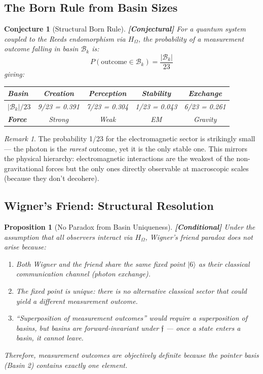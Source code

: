 \documentclass[12pt,a4paper]{article}
\newcommand{\conditional}[1]{\textcolor{conditional}{\textbf{[Conditional]}} #1}
\newcommand{\conjectural}[1]{\textcolor{conjectural}{\textbf{[Conjectural]}} #1}
\newtheorem{proposition}[theorem]{Proposition}
\newtheorem{conjecture}[theorem]{Conjecture}
\theoremstyle{definition}
\theoremstyle{remark}
\newtheorem{remark}[theorem]{Remark}
\newcommand{\Reeds}{\mathfrak{f}}
\newcommand{\Basin}{\mathcal{B}}
\newcommand{\HOmega}{H_\Omega}
\begin{document}
\subsection{The Born Rule from Basin Sizes}

\begin{conjecture}[Structural Born Rule]
\label{conj:born}
\conjectural{For a quantum system coupled to the Reeds endomorphism via $\HOmega$,
the probability of a measurement outcome falling in basin $\Basin_k$ is:}
\begin{equation}
  P(\text{outcome} \in \Basin_k) = \frac{|\Basin_k|}{23}
\end{equation}
giving:
\begin{center}
\begin{tabular}{lcccc}
\toprule
\textbf{Basin} & Creation & Perception & Stability & Exchange \\
\midrule
$|\Basin_k|/23$ & 9/23 = 0.391 & 7/23 = 0.304 & 1/23 = 0.043 & 6/23 = 0.261 \\
\textbf{Force} & Strong & Weak & EM & Gravity \\
\bottomrule
\end{tabular}
\end{center}
\end{conjecture}

\begin{remark}
The probability 1/23 for the electromagnetic sector is strikingly small --- the
photon is the \emph{rarest} outcome, yet it is the only stable one. This mirrors
the physical hierarchy: electromagnetic interactions are the weakest of the
non-gravitational forces but the only ones directly observable at macroscopic
scales (because they don't decohere).
\end{remark}

\subsection{Wigner's Friend: Structural Resolution}

\begin{proposition}[No Paradox from Basin Uniqueness]
\label{prop:wigner}
\conditional{Under the assumption that all observers interact via $\HOmega$,
Wigner's friend paradox does not arise because:}
\begin{enumerate}
  \item Both Wigner and the friend share the same fixed point $|6\rangle$ as
  their classical communication channel (photon exchange).
  \item The fixed point is \emph{unique}: there is no alternative classical
  sector that could yield a different measurement outcome.
  \item ``Superposition of measurement outcomes'' would require a superposition
  of basins, but basins are forward-invariant under $\Reeds$ --- once a state
  enters a basin, it cannot leave.
\end{enumerate}
Therefore, measurement outcomes are \emph{objectively definite} because the
pointer basis (Basin 2) contains exactly one element.
\end{proposition}
\end{document}
